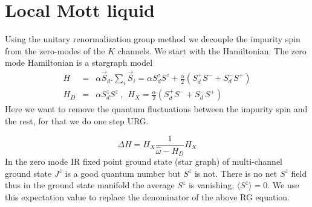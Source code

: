 \documentclass[reprint,prb,superscriptaddress]{revtex4-2}
\begin{document}
\section{Local Mott liquid}

\noindent Using the unitary renormalization group method we decouple the impurity spin from the zero-modes of the $K$ channels. We start with the Hamiltonian. The zero mode Hamiltonian is a stargraph model 
\begin{eqnarray}
H &=& \alpha \vec{S}_d.\displaystyle\sum_i \vec{S}_i =\alpha S_d^zS^z + \frac{\alpha}{2} (S_d^+S^-+ S_d^-S^+) \nonumber\\
H_D &=& \alpha S^z_d S^z~,~~ H_X = \frac{\alpha}{2} (S_d^+S^-+ S_d^-S^+)
\end{eqnarray}
Here we want to remove the quantum fluctuations between the impurity spin and the rest, for that we do one step URG.

\begin{equation}
\Delta H = H_X \frac{1}{\hat{\omega}-H_D} H_X
\end{equation}
In the zero mode IR fixed point ground state (star graph) of multi-channel ground state $J^z$ is a good quantum number but $S^z$ is not. There is no net $S^z$ field thus in the ground state manifold the average $S^z$ is vanishing, $\langle S^z \rangle=0$. We use this expectation value to replace the denominator of the above RG equation.
\end{document}
